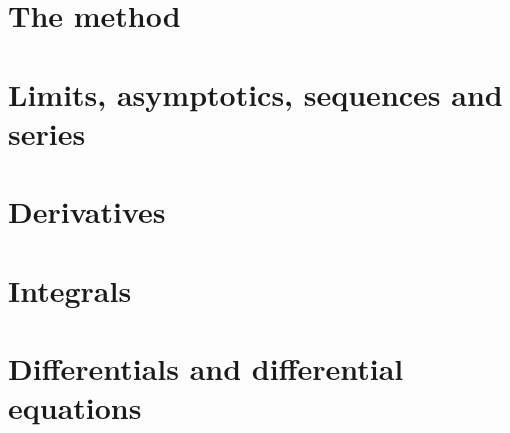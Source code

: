 \documentclass[10pt,openany]{book}
\begin{document}
\frontmatter


\pagestyle{plain}
{\hypersetup{linkcolor=ink}
\renewcommand{\contentsname}{\sffamily\bfseries\color{navy}\fontsize{20}{24}\selectfont Contents}
\tableofcontents}
\clearpage

\mainmatter
\pagestyle{fancy}

\part{The method}



\part{Limits, asymptotics, sequences and series}









\part{Derivatives}









\part{Integrals}












\part{Differentials and differential equations}











\end{document}
